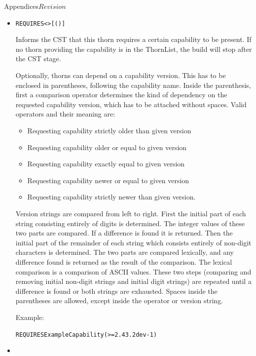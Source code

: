 \begin{cactuspart}{Appendices}{}{$Revision$}
\begin{itemize}
\item

\begin{alltt}
REQUIRES  <> [( )]
\end{alltt}

Informs the CST that this thorn requires a certain capability to be
present.  If no thorn providing the capability is in the ThornList,
the build will stop after the CST stage.

Optionally, thorns can depend on a capability version. This has to be enclosed in
parentheses, following the capability name. Inside the parenthesis, first a comparison
operator determines the kind of dependency on the requested capability version, which
has to be attached without spaces. Valid operators and their meaning are:
\begin{itemize}
 \item[$<<$] Requesting capability strictly older than given version
 \item[$<=$] Requesting capability older or equal to given version
 \item[$=$]  Requesting capability exactly equal to given version
 \item[$>=$] Requesting capability newer or equal to given version
 \item[$>>$] Requesting capability strictly newer than given version.
\end{itemize}
Version strings are compared from left to right. First the initial part of each
string consisting entirely of digits is determined. The integer values of
these two parts are compared. If a difference is found it is returned. Then the
initial part of the remainder of each string which consists entirely of
non-digit characters is determined. The two parts are compared lexically, and
any difference found is returned as the result of the comparison. The lexical
comparison is a comparison of ASCII values. These two steps (comparing and
removing initial non-digit strings and initial digit strings) are repeated
until a difference is found or both strings are exhausted. Spaces inside the
parentheses are allowed, except inside the operator or version string.

Example:

\begin{alltt}
REQUIRES ExampleCapability (>=2.43.2dev-1)
\end{alltt}


\item


\end{itemize}
\end{cactuspart}
